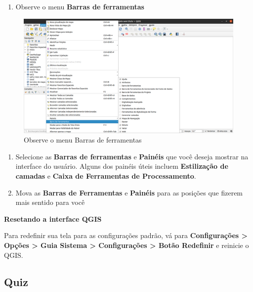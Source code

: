 \documentclass[
]{krantz}
\providecommand{\tightlist}{%
  \setlength{\itemsep}{0pt}\setlength{\parskip}{0pt}}
\begin{document}
\begin{enumerate}
\def\labelenumi{\arabic{enumi}.}
\setcounter{enumi}{3}
\tightlist
\item
  Observe o menu \textbf{Barras de ferramentas}
\end{enumerate}

\begin{figure}
\centering
\includegraphics{media/modulo1/ex01-03.png}
\caption{Observe o menu Barras de ferramentas}
\end{figure}

\begin{enumerate}
\def\labelenumi{\arabic{enumi}.}
\setcounter{enumi}{4}
\tightlist
\item
  Selecione as \textbf{Barras de ferramentas} e \textbf{Painéis} que você deseja mostrar na interface do usuário. Alguns dos painéis úteis incluem \textbf{Estilização de camadas} e \textbf{Caixa de Ferramentas de Processamento}.
\item
  Mova as \textbf{Barras de Ferramentas} e \textbf{Painéis} para as posições que fizerem mais sentido para você
\end{enumerate}

\textbf{Resetando a interface QGIS}

Para redefinir sua tela para as configurações padrão, vá para \textbf{Configurações \textgreater{} Opções \textgreater{} Guia Sistema \textgreater{} Configurações \textgreater{} Botão Redefinir} e reinicie o QGIS.

\hypertarget{quiz-3}{%
\subsection{Quiz}\label{quiz-3}}
\end{document}
